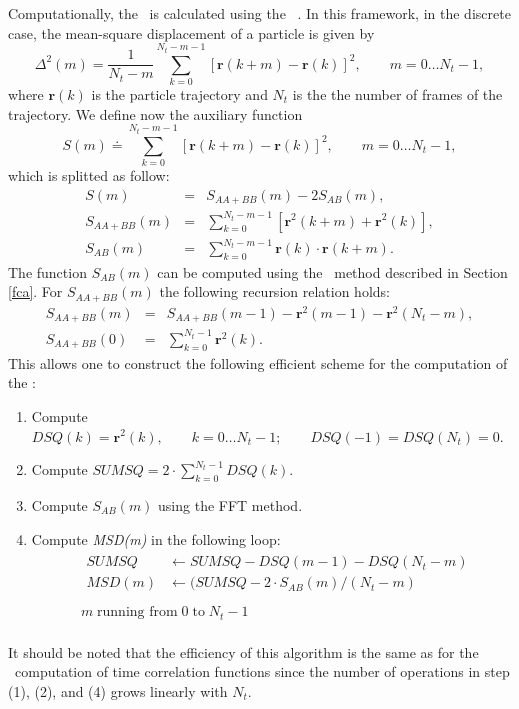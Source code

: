 \documentclass[a4paper,11pt]{report}
\begin{document}
Computationally, the \MSD\ is calculated using the \FCA\ \cite{Kneller:KFA}. In this 
framework, in the discrete case, the mean-square displacement of a particle is given by
\begin{equation}
\label{eq:msd_discrete}
\Delta^2(m) = \frac{1}{N_t - m}\sum_{k=0}^{N_t-m-1}
[\textbf{r}(k+m) - \textbf{r}(k)]^2, \qquad m = 0\ldots N_t-1,
\end{equation}
where $\textbf{r}(k)$ is the particle trajectory and $N_t$ is the the number of frames of the trajectory. We define now the
auxiliary function
\begin{equation}
S(m) \doteq \sum_{k=0}^{N_t-m-1}[\textbf{r}(k+m) - \textbf{r}(k)]^2, 
\qquad m = 0\ldots N_t-1,
\end{equation}
which is splitted as follow:
\begin{eqnarray}
S(m)          &= &S_{AA+BB}(m) - 2 S_{AB}(m),\\
S_{AA+BB}(m)  &= &\sum_{k=0}^{N_t-m-1}[\textbf{r}^2(k+m) + \textbf{r}^2(k)], \\
S_{AB}(m)     &= &\sum_{k=0}^{N_t-m-1} \textbf{r}(k)\cdot\textbf{r}(k+m). 
\end{eqnarray}
The function $S_{AB}(m)$ can be computed using the \FCA\ method described
in Section \ref{fca}. For $S_{AA+BB}(m)$ the following recursion
relation holds:
\begin{eqnarray}
S_{AA+BB}(m) &= &S_{AA+BB}(m-1) - \textbf{r}^2(m-1)  - \textbf{r}^2(N_t - m),\\
S_{AA+BB}(0) &= &\sum_{k=0}^{N_t-1} \textbf{r}^2(k).
\end{eqnarray}
This allows one to construct the following efficient scheme for the
computation of the \MSD:
\begin{enumerate}
\item Compute $DSQ(k) = \textbf{r}^2(k),\qquad k = 0\ldots N_t-1;\qquad
      DSQ(-1) = DSQ(N_t) = 0$.
\item Compute $SUMSQ = 2\cdot\sum_{k=0}^{N_t-1} DSQ(k)$.
\item Compute $S_{AB}(m)$ using the FFT method.
\item Compute \textit{MSD(m)} in the following loop:
      \begin{displaymath}
      \begin{array}{ll}
                &\begin{array}{ll}
                 SUMSQ  &\leftarrow SUMSQ - DSQ(m-1) - DSQ(N_t - m)\\
                 MSD(m) &\leftarrow (SUMSQ - 2\cdot S_{AB}(m)/(N_t-m)\\
                \end{array}\\
                 &m\; \mbox{running from}\; 0 \;\mbox{to}\; N_t - 1\\
      \end{array}
      \end{displaymath}
\end{enumerate}
It should be noted that the efficiency of this algorithm is the same
as for the \FCA\ computation of time correlation functions since the
number of operations in step (1), (2), and (4) grows linearly with
$N_t$.
\newpage
\end{document}
